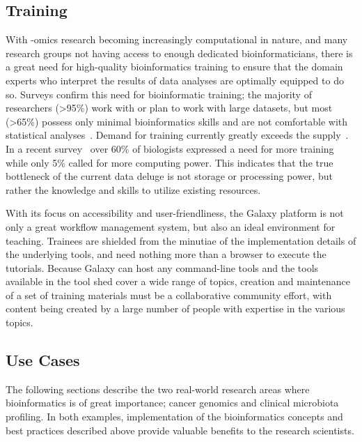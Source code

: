 \begin{justify}
\subsection{Training}
With -omics research becoming increasingly computational in nature, and many research groups not having access to enough dedicated bioinformaticians, there is a great need for high-quality bioinformatics training to ensure that the domain experts who interpret the results of data analyses are optimally equipped to do so. Surveys confirm this need for bioinformatic training; the majority of researchers (>95\%) work with or plan to work with large datasets, but most (>65\%) possess only minimal bioinformatics skills and are not comfortable with statistical analyses~\cite{larcombe2017elixir,williams2017vision}. Demand for training currently greatly exceeds the supply~\cite{attwood2017global}. In a recent survey~\cite{survey2013embl} over 60\% of biologists expressed a need for more training while only 5\% called for more computing power. This indicates that the true bottleneck of the current data deluge is not storage or processing power, but rather the knowledge and skills to utilize existing resources.

With its focus on accessibility and user-friendliness, the Galaxy platform is not only a great workflow management system, but also an ideal environment for teaching. Trainees are shielded from the minutiae of the implementation details of the underlying tools, and need nothing more than a browser to execute the tutorials. Because Galaxy can host any command-line tools and the tools available in the tool shed cover a wide range of topics, creation and maintenance of a set of training materials must be a collaborative community effort, with content being created by a large number of people with expertise in the various topics.

\subsection{Use Cases}
The following sections describe the two real-world research areas where bioinformatics is of great importance; cancer genomics and clinical microbiota profiling. In both examples, implementation of the bioinformatics concepts and best practices described above provide valuable benefits to the research scientists.




\end{justify}
